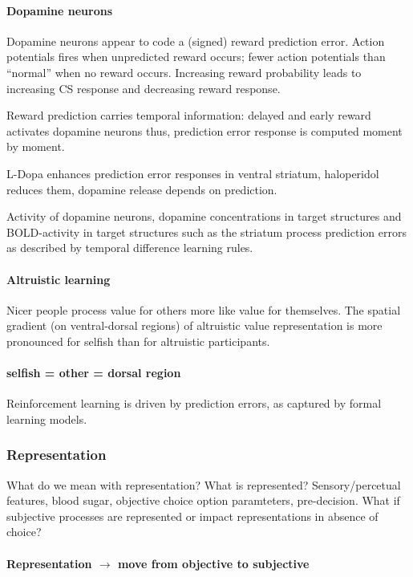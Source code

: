 \documentclass[12pt,article,oneside,a4paper]{memoir}
\begin{document}
\paragraph{Dopamine neurons} 
Dopamine neurons appear to code a (signed) reward prediction error. Action
potentials fires when unpredicted reward occurs; fewer action potentials than
``normal'' when no reward occurs. Increasing reward probability leads to
increasing CS response and decreasing reward response.

Reward prediction carries temporal information: delayed and early reward
activates dopamine neurons thus, prediction error response is computed moment
by moment.

L-Dopa enhances prediction error responses in ventral striatum, haloperidol
reduces them, dopamine release depends on prediction.

Activity of dopamine neurons, dopamine concentrations in target structures and
BOLD-activity in target structures such as the striatum process prediction
errors as described by temporal difference learning rules.

\paragraph{Altruistic learning}
Nicer people process value for others more like value for themselves. The spatial
gradient (on ventral-dorsal regions) of altruistic value representation is more
pronounced for selfish than for altruistic participants.
\paragraph{selfish = other = dorsal region}

Reinforcement learning is driven by prediction errors, as captured by formal
learning models.

\subsubsection{Representation}
What do we mean with representation?
What is represented? Sensory/percetual features, blood sugar, objective choice
option paramteters, pre-decision.
What if subjective processes are represented or impact representations in
absence of choice?

\paragraph{Representation $\rightarrow$ move from objective to subjective}
\end{document}
